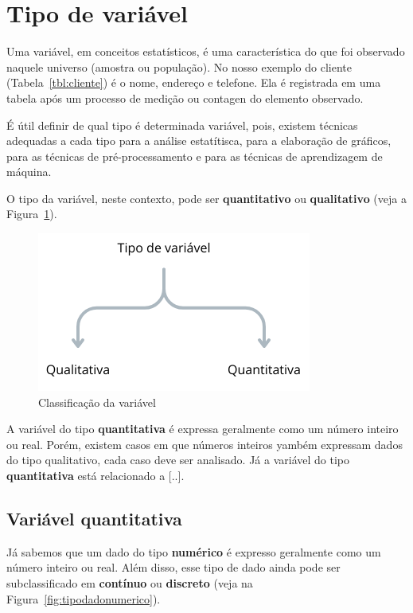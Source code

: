 \documentclass[a4paper,12pt]{book}
\begin{document}
\section{Tipo de variável}
	
Uma variável, em conceitos estatísticos, é uma característica do que foi observado naquele universo (amostra ou população). No nosso exemplo do cliente (Tabela~\ref{tbl:cliente}) é o nome, endereço e telefone. Ela é registrada em uma tabela após um processo de medição ou contagen do elemento observado. 

É útil definir de qual tipo é determinada variável, pois, existem técnicas adequadas a cada tipo para a análise estatítisca, para a elaboração de gráficos, para as técnicas de pré-processamento e para as técnicas de aprendizagem de máquina. 

O tipo da variável, neste contexto, pode ser \textbf{quantitativo} ou \textbf{qualitativo} (veja a Figura~\ref{fig:tipodado}).
	
\begin{figure}[!h]
	\centering
	\includegraphics[width=0.7\linewidth]{figuras/tipo_variavel.png}
	\caption{Classificação da variável}
	\label{fig:tipodado}
\end{figure}
	
A variável do tipo \textbf{quantitativa} é expressa geralmente como um número inteiro ou real. Porém, existem casos em que números inteiros yambém expressam dados do tipo qualitativo, cada caso deve ser analisado. Já a variável do tipo \textbf{quantitativa} está relacionado a [..]. 
	
\subsection{Variável quantitativa}
	
	Já sabemos que um dado do tipo \textbf{numérico} é expresso geralmente como um número inteiro ou real. Além disso, esse tipo de dado ainda pode ser subclassificado em \textbf{contínuo} ou \textbf{discreto} (veja na Figura~\ref{fig:tipodadonumerico}). 
	
\end{document}

